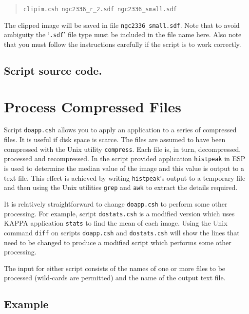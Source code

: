 \documentclass[twoside,11pt]{article}
\newcommand{\htmladdnormallink}[2]{#1}
\newcommand{\xref}[3]{#1}
\newcommand{\xlabel}[1]{}
\begin{document}
\begin{quote}
{\tt clipim.csh ngc2336\_r\_2.sdf ngc2336\_small.sdf}
\end{quote}

The clipped image will be saved in file {\tt ngc2336\_small.sdf}.  Note
that to avoid ambiguity the `{\tt .sdf}' file type must be included in
the file name here.  Also note that you must follow the instructions
carefully if the script is to work correctly.

\begin{htmlonly}
\subsection*{\htmladdnormallink{Script source code.}{clipim.lis}}
\end{htmlonly}


\newpage
\section{\xlabel{DOAPP}\label{DOAPP}Process Compressed Files}

Script {\tt doapp.csh} allows you to apply an application to a series
of compressed files.  It is useful if disk space is scarce.  The files
are assumed to have been compressed with the Unix utility {\tt compress}.
Each file is, in turn, decompressed, processed and recompressed.  In the
script provided application \xref{{\tt histpeak}}{sun180}{SESSION1} in
\xref{ESP}{sun180}{} is used to determine the median value of the image and
this value is output to a text file.  This effect is achieved by writing
{\tt histpeak}'s output to a temporary file and then using the Unix
utilities {\tt grep} and {\tt awk} to extract the details required.

It is relatively straightforward to change {\tt doapp.csh} to perform
some other processing.  For example, script {\tt dostats.csh} is a
modified version which uses \xref{KAPPA}{sun95}{} application
\xref{{\tt stats}}{sun95}{STATS} to find the mean of each image.
Using the Unix command {\tt diff} on scripts {\tt doapp.csh} and
{\tt dostats.csh} will show the lines that need to be changed to
produce a modified script which performs some other processing.

The input for either script consists of the names of one or more files to
be processed (wild-cards are permitted) and the name of the output text
file.

\subsection*{Example}
\end{document}
